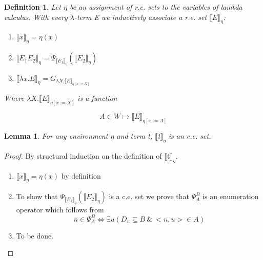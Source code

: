 \documentclass{article}
\newtheorem{lemma}[theorem]{Lemma} %
\newtheorem{definition}{Definition}[section] %
\begin{document}
	\begin{definition}
		Let $\eta$ be an assignment of r.e. sets to the variables of 
		lambda calculus. With every $\lambda$-term E we inductively 
		associate a r.e. set $\llbracket E \rrbracket_{\eta}$:
			\begin{enumerate}
				\item $\llbracket x \rrbracket_{\eta} = \eta (x)$
				\item $\llbracket E_1 E_2 \rrbracket_{\eta} = 
					\Psi_{\llbracket E_1 \rrbracket_\eta} 
					(\llbracket E_2 \rrbracket_\eta)$
				\item $\llbracket \lambda x.E \rrbracket_{\eta} = 
					G_{\lambda X. \llbracket E \rrbracket_{\eta [x := X]}}$
			\end{enumerate}
			Where $\lambda X. \llbracket E \rrbracket_{\eta [x := X]}$ is a function

		\begin{equation}
			A \in W \mapsto \llbracket E \rrbracket_{\eta [x := A]}
		\end{equation}
	\end{definition}

	\begin{lemma}
		For any environment $\eta$ and term t, 
			$\llbracket$t$\rrbracket_\eta$ is an c.e. set.
	\end{lemma}
	\begin{proof}
		By structural induction on the definition of 
			$\llbracket$t$\rrbracket_\eta$.
		\begin{enumerate}
			\item 
				$\llbracket x \rrbracket_\eta = \eta (x)$ by definition
			\item
				To show that $\Psi_{\llbracket E_1 \rrbracket_\eta} 
				(\llbracket E_2 \rrbracket_\eta)$ is a c.e. set we
				prove that $\Psi^B_A$ is an enumeration operator which 
				follows from 
				\begin{equation} 
					n \in \Psi^B_A \iff \exists u (D_u \subseteq B 
					\:\&\: <n, u> \in A)
				\end{equation}
			\item
				To be done.
		\end{enumerate}
	\end{proof}
	
\end{document}
